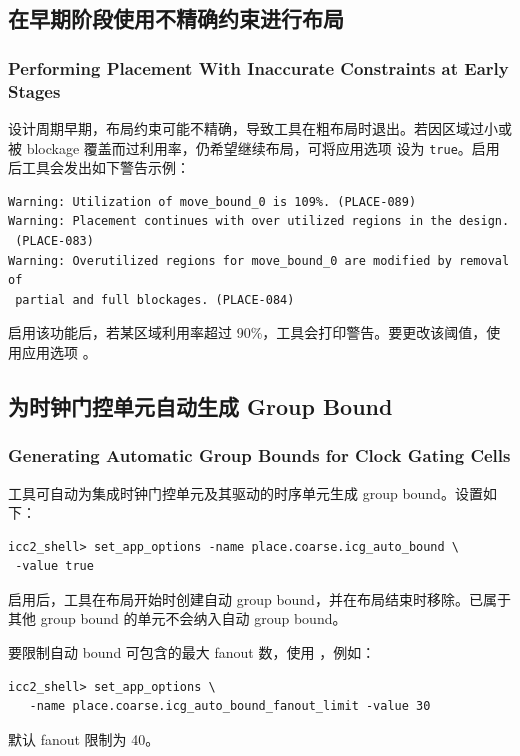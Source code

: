 \subsection{在早期阶段使用不精确约束进行布局}
\subsubsection*{Performing Placement With Inaccurate Constraints at Early Stages}

设计周期早期，布局约束可能不精确，导致工具在粗布局时退出。若因区域过小或被 blockage 覆盖而过利用率，仍希望继续布局，可将应用选项  设为 \texttt{true}。启用后工具会发出如下警告示例：
\begin{lstlisting}
Warning: Utilization of move_bound_0 is 109%. (PLACE-089)
Warning: Placement continues with over utilized regions in the design.
 (PLACE-083)
Warning: Overutilized regions for move_bound_0 are modified by removal of
 partial and full blockages. (PLACE-084)
\end{lstlisting}

启用该功能后，若某区域利用率超过 90\%，工具会打印警告。要更改该阈值，使用应用选项 。

\subsection{为时钟门控单元自动生成 Group Bound}
\subsubsection*{Generating Automatic Group Bounds for Clock Gating Cells}

工具可自动为集成时钟门控单元及其驱动的时序单元生成 group bound。设置如下：
\begin{lstlisting}
icc2_shell> set_app_options -name place.coarse.icg_auto_bound \
 -value true
\end{lstlisting}

启用后，工具在布局开始时创建自动 group bound，并在布局结束时移除。已属于其他 group bound 的单元不会纳入自动 group bound。

要限制自动 bound 可包含的最大 fanout 数，使用 ，例如：
\begin{lstlisting}
icc2_shell> set_app_options \
   -name place.coarse.icg_auto_bound_fanout_limit -value 30
\end{lstlisting}
默认 fanout 限制为 40。

